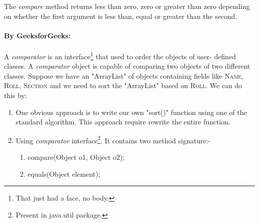 \documentclass[10 pt]{book}
\begin{document}
The \textit{compare} method returns less than zero, zero or greater than zero depending on whether the first argument is less than, equal or greater than the second.
\paragraph{By GeeksforGeeks:}
A \textit{comparator} is an interface\footnote{That just had a face, no body.} that used to order the objects of user-	defined classes. A \textit{comparator} object is capable of comparing two objects of two different classes. Suppose we have an "ArrayList" of objects containing fields like \textsc{Name, Roll, Section} and we need to sort the "ArrayList" based on \textsc{Roll}. We can do this by:
	\begin{enumerate}
		\item[Method 1:] One obvious approach is to write our own "sort()" function using one of the standard algorithm. This approach require rewrite the entire function.
		\item[Method 2:] Using \textit{comparator} interface\footnote{Present in java.util package.}. It contains two method signature:-
		\begin{enumerate}
			\item compare(Object o1, Object o2);
			\item equals(Object element);
		\end{enumerate}
	\end{enumerate}
	
\end{document}
